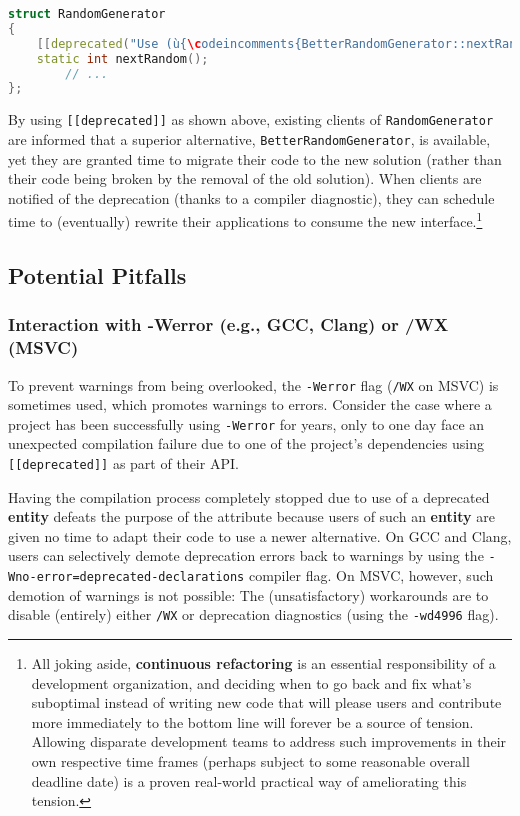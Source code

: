 \begin{lstlisting}[language=C++]
struct RandomGenerator
{
    [[deprecated("Use (ù{\codeincomments{BetterRandomGenerator::nextRandom()}}ù) instead.")]]
    static int nextRandom();
        // ...
};
\end{lstlisting}

\noindent By using \texttt{[[deprecated]]} as shown above, existing clients of
\texttt{RandomGenerator} are informed that a superior
alternative, \texttt{BetterRandomGenerator}, is available, yet they are granted time to
migrate their code to the new solution (rather than their code being broken by the
removal of the old solution). When clients are notified of the
deprecation (thanks to a compiler diagnostic), they can schedule time to
(eventually) rewrite their applications to consume the new interface.{\cprotect\footnote{All joking aside, \textbf{continuous refactoring} is
an essential responsibility of a development organization, and
deciding when to go back and fix what's suboptimal instead of writing
new code that will please users and contribute more immediately to the
bottom line will forever be a source of tension. Allowing disparate
development teams to address such improvements in their own respective
time frames (perhaps subject to some reasonable overall deadline
date) is a proven real-world practical way of ameliorating this
  tension.}}

\subsection[Potential Pitfalls]{Potential Pitfalls}\label{potential-pitfalls}

\subsubsection[Interaction with {\tt -Werror} (e.g., GCC, Clang) or {\tt /WX} (MSVC)]{Interaction with {\SubsubsecCode -Werror} (e.g., GCC, Clang) or {\SubsubsecCode /WX} (MSVC)}\label{interaction-with--werror-(e.g,-gcc,-clang)-or-/wx-(msvc)}

To prevent warnings from being overlooked, the \texttt{-Werror} flag
(\texttt{/WX} on MSVC) is sometimes used, which promotes warnings to
errors. Consider the case where a project has been successfully using
\texttt{-Werror} for years, only to one day face an unexpected
compilation failure due to one of the project's dependencies using
\texttt{[[deprecated]]} as part of their API.

Having the compilation process completely stopped due to use of a
deprecated \textbf{entity} defeats the purpose of the attribute because users of such an \textbf{entity} are given no time to adapt their code
to use a newer alternative. On GCC and Clang, users can selectively demote deprecation errors back to warnings by using the
\texttt{-Wno-error=deprecated-declarations} compiler flag. On MSVC,
however, such demotion of warnings is not possible: The (unsatisfactory)
workarounds are to disable (entirely) either \texttt{/WX} or deprecation
diagnostics (using the \texttt{-wd4996} flag).

